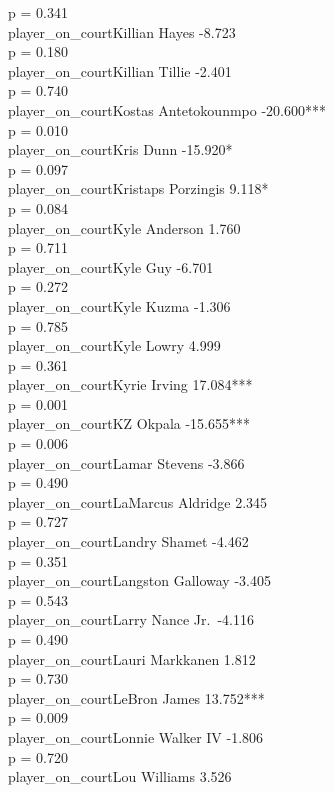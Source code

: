 \documentclass[
  landscape]{article}
\begin{document}
p = 0.341\\
player\_on\_courtKillian Hayes -8.723\\
p = 0.180\\
player\_on\_courtKillian Tillie -2.401\\
p = 0.740\\
player\_on\_courtKostas Antetokounmpo -20.600***\\
p = 0.010\\
player\_on\_courtKris Dunn -15.920*\\
p = 0.097\\
player\_on\_courtKristaps Porzingis 9.118*\\
p = 0.084\\
player\_on\_courtKyle Anderson 1.760\\
p = 0.711\\
player\_on\_courtKyle Guy -6.701\\
p = 0.272\\
player\_on\_courtKyle Kuzma -1.306\\
p = 0.785\\
player\_on\_courtKyle Lowry 4.999\\
p = 0.361\\
player\_on\_courtKyrie Irving 17.084***\\
p = 0.001\\
player\_on\_courtKZ Okpala -15.655***\\
p = 0.006\\
player\_on\_courtLamar Stevens -3.866\\
p = 0.490\\
player\_on\_courtLaMarcus Aldridge 2.345\\
p = 0.727\\
player\_on\_courtLandry Shamet -4.462\\
p = 0.351\\
player\_on\_courtLangston Galloway -3.405\\
p = 0.543\\
player\_on\_courtLarry Nance Jr.~-4.116\\
p = 0.490\\
player\_on\_courtLauri Markkanen 1.812\\
p = 0.730\\
player\_on\_courtLeBron James 13.752***\\
p = 0.009\\
player\_on\_courtLonnie Walker IV -1.806\\
p = 0.720\\
player\_on\_courtLou Williams 3.526\\
\end{document}
